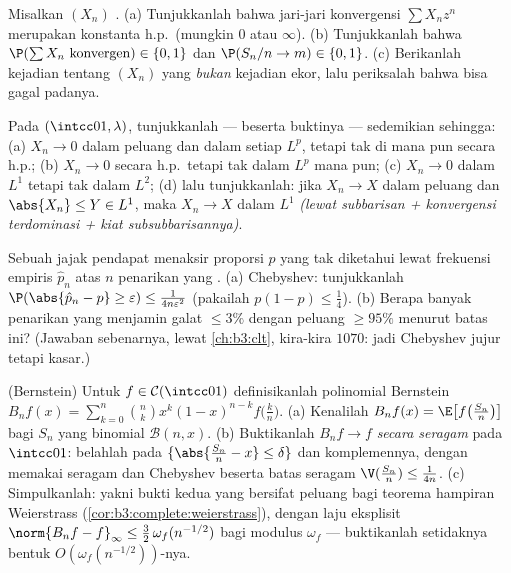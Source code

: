 \begin{exercise}[$\star\star$]\label{exo:b3:probability:5}
Misalkan $(X_n)$ .
(a) Tunjukkanlah bahwa jari-jari konvergensi $\sum X_n z^n$ merupakan
konstanta h.p.\ (mungkin $0$ atau $\infty$).
(b) Tunjukkanlah bahwa $\P(\sum X_n \text{ konvergen}) \in \{0, 1\}$
dan $\P(S_n/n \to m) \in \{0,1\}$.
(c) Berikanlah kejadian tentang $(X_n)$ yang \emph{bukan} kejadian
ekor, lalu periksalah bahwa  bisa gagal padanya.
\end{exercise}

\begin{exercise}[$\star\star$]\label{exo:b3:probability:6}
Pada $(\intcc01, \lambda)$, tunjukkanlah --- beserta buktinya ---  sedemikian sehingga:
(a) $X_n \to 0$ dalam peluang dan dalam setiap $L^p$, tetapi
tak di mana pun secara h.p.;
(b) $X_n \to 0$ secara h.p.\ tetapi tak dalam $L^p$ mana pun;
(c) $X_n \to 0$ dalam $L^1$ tetapi tak dalam $L^2$;
(d) lalu tunjukkanlah: jika $X_n \to X$ dalam peluang dan $\abs{X_n}
\leq Y \in L^1$, maka $X_n \to X$ dalam $L^1$
\emph{(lewat subbarisan + konvergensi terdominasi +
kiat subsubbarisannya)}.
\end{exercise}

\begin{exercise}[$\star\star$]\label{exo:b3:probability:7}
Sebuah jajak pendapat menaksir proporsi $p$ yang tak diketahui lewat
frekuensi empiris $\hat p_n$ atas $n$ penarikan yang .
(a) Chebyshev: tunjukkanlah $\P(\abs{\hat p_n - p} \geq \varepsilon)
\leq \frac1{4n\varepsilon^2}$ (pakailah $p(1-p) \leq \frac14$).
(b) Berapa banyak penarikan yang menjamin galat $\leq 3\%$ dengan
peluang $\geq 95\%$ menurut batas ini? (Jawaban sebenarnya,
lewat \cref{ch:b3:clt}, kira-kira $1070$: jadi Chebyshev jujur
tetapi kasar.)
\end{exercise}

\begin{exercise}[$\star\star\star$]\label{exo:b3:probability:8}
(Bernstein) Untuk $f \in \mathcal C(\intcc01)$ definisikanlah
polinomial Bernstein $B_nf(x) =
\sum_{k=0}^n\binom nkx^k(1-x)^{n-k}f\bigl(\frac kn\bigr)$.
(a) Kenalilah $B_nf(x) = \E\bigl[f\bigl(\frac
{S_n}n\bigr)\bigr]$ bagi $S_n$ yang binomial $\mathcal B(n, x)$.
(b) Buktikanlah $B_nf \to f$ \emph{secara seragam} pada $\intcc01$: belahlah
pada $\{\abs{\frac{S_n}n - x} \leq \delta\}$ dan
komplemennya, dengan memakai  seragam dan Chebyshev beserta
batas seragam $\V(\frac{S_n}n) \leq \frac1{4n}$.
(c) Simpulkanlah: yakni bukti kedua yang bersifat peluang bagi
teorema hampiran Weierstrass
(\cref{cor:b3:complete:weierstrass}), dengan laju eksplisit
$\norm{B_nf - f}_\infty \leq \frac32\,\omega_f(n^{-1/2})$
bagi modulus  $\omega_f$ --- buktikanlah setidaknya
bentuk $O(\omega_f(n^{-1/2}))$-nya.
\end{exercise}

